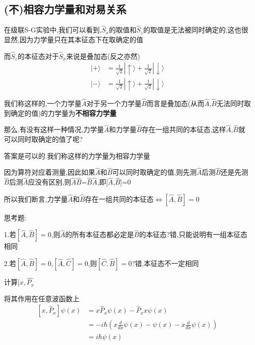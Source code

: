 \documentclass[lang=cn,15pt]{elegantbook}
\begin{document}
\subsection{(不)相容力学量和对易关系}

在级联S-G实验中,我们可以看到,$\hat{S}_{x}$的取值和$\hat{S}_{z}$的取值是无法被同时确定的,这也很显然,因为力学量只在其本征态下在取确定的值

而$\hat{S}_{z}$的本征态对于$\hat{S}_{x}$来说是叠加态(反之亦然)
 \begin{equation*}
	\begin{split}
		|+\rangle &=\frac{1}{\sqrt{2}}|\uparrow \rangle +\frac{1}{\sqrt{2}}|\downarrow \rangle 
		\\
		|-\rangle &=\frac{1}{\sqrt{2}}|\uparrow \rangle +\frac{1}{\sqrt{2}}|\downarrow \rangle 
	\end{split}
\end{equation*}

我们称这样的,一个力学量$\hat{A}$对于另一个力学量$\hat{B}$而言是叠加态(从而$\hat{A}$,$\hat{B}$无法同时取到确定的值)的力学量为\textbf{不相容力学量}

那么.有没有这样一种情况,力学量$\hat{A}$和力学量$\hat{B}$存在一组共同的本征态,这样$\hat{A}$,$\hat{B}$就可以同时取确定的值了呢?

答案是可以的.我们称这样的力学量为相容力学量

因为算符对应着测量,因此如果$\hat{A}$和$\hat{B}$可以同时取确定的值,则先测$\hat{A}$后测$\hat{B}$还是先测$\hat{B}$后测$\hat{A}$应没有区别,则$\hat{A}$$\hat{B}$=$\hat{B}$$\hat{A}$,即[$\hat{A}$,$\hat{B}$]=0

所以我们断言,$\text{力学量}\hat{A}\text{和}\hat{B}\text{存在一组共同的本征态}\Leftrightarrow \left[ \hat{A},\hat{B} \right] =0$


思考题:

1.若$\left[ \hat{A},\hat{B} \right] =0$,则$\hat{A}$的所有本征态都必定是$\hat{B}$的本征态?错,只能说明有一组本征态相同

2.若$\left[ \hat{A},\hat{B} \right] =0$,$\left[ \hat{A},\hat{C} \right] =0$,则$\left[ \hat{C},\hat{B} \right] =0$?错,本征态不一定相同



计算$[x,\hat{P_x}$

将其作用在任意波函数上
\begin{equation*}
	\begin{split}
		\left[ x,\hat{P}_x \right] \psi \left( x \right) &=x\hat{P}_x\psi \left( x \right) -\hat{P}_xx\psi \left( x \right) 
		\\
		&=-i\hbar \left( x\frac{d}{dx}\psi \left( x \right) -\psi \left( x \right) -x\frac{d}{dx}\psi \left( x \right) \right) 
		\\
		&=i\hbar \psi \left( x \right) 
	\end{split}
\end{equation*}
\end{document}
